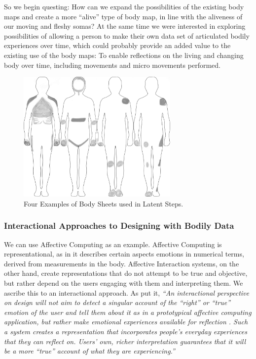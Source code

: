 So we begin questing: How can we expand the possibilities of the existing body maps and create a more ``alive'' type of body map, in line with the aliveness of our moving and fleshy somas? At the same time we were interested in exploring possibilities of allowing a person to make their own data set of articulated bodily experiences over time, which could probably provide an added value to the existing use of the body maps: To enable reflections on the living and changing body over time, including movements and micro movements performed.


\begin{figure}[ht]
    \centering
    \includegraphics[width=0.70\textwidth]{Chapters/Figures/modi_dis/drawing_samples2.png}
    \caption{Four Examples of Body Sheets used in Latent Steps.}
    \label{fig:draw_samples}
\end{figure}

\subsubsection{Interactional Approaches to Designing with Bodily Data}

We can use Affective Computing as an example. Affective Computing is representational, as in it describes certain aspects emotions in numerical terms, derived from measurements in the body. Affective Interaction systems, on the other hand, create representations that do not attempt to be true and objective, but rather depend on the users engaging with them and interpreting them. We ascribe this to an interactional approach. As \citeauthor{hook_affective_2009} put it, \textit{“An interactional perspective on design will not aim to detect a singular account of the “right” or “true” emotion of the user and tell them about it as in a prototypical affective computing application, but rather make emotional experiences available for reflection \cite{hook_affective_2009}. Such a system creates a representation that incorporates people’s everyday experiences that they can reflect on. Users’ own, richer interpretation guarantees that it will be a more “true” account of what they are experiencing.”}

